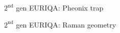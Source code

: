 \documentclass{beamer}
\begin{document}




\begin{frame}{$2^{\text{nd}}$ gen EURIQA: Pheonix trap}
  \begin{center}
    \begin{tikzpicture}
    \end{tikzpicture}
  \end{center}
\end{frame}


\begin{frame}{$2^{\text{nd}}$ gen EURIQA: Raman geometry}
  \begin{center}
    \begin{tikzpicture}
    \end{tikzpicture}
  \end{center}
\end{frame}
\end{document}
